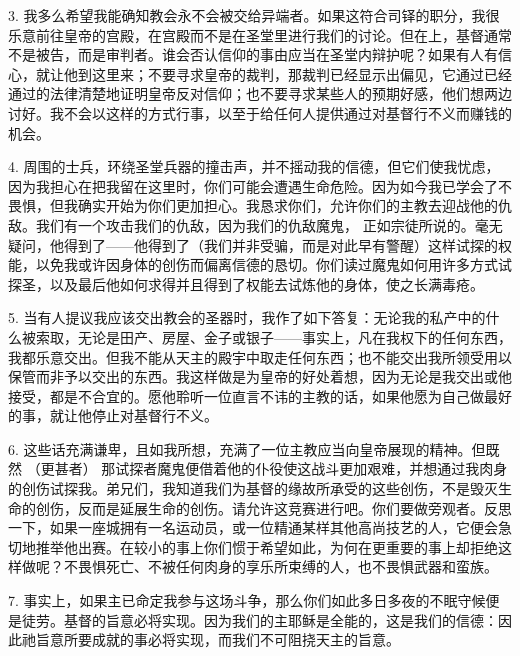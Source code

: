 3. 我多么希望我能确知教会永不会被交给异端者。如果这符合司铎的职分，我很乐意前往皇帝的宫殿，在宫殿而不是在圣堂里进行我们的讨论。但在上，基督通常不是被告，而是审判者。谁会否认信仰的事由应当在圣堂内辩护呢？如果有人有信心，就让他到这里来；不要寻求皇帝的裁判，那裁判已经显示出偏见，它通过已经通过的法律清楚地证明皇帝反对信仰；也不要寻求某些人的预期好感，他们想两边讨好。我不会以这样的方式行事，以至于给任何人提供通过对基督行不义而赚钱的机会。\par

4. 周围的士兵，环绕圣堂兵器的撞击声，并不摇动我的信德，但它们使我忧虑，因为我担心在把我留在这里时，你们可能会遭遇生命危险。因为如今我已学会了不畏惧，但我确实开始为你们更加担心。我恳求你们，允许你们的主教去迎战他的仇敌。我们有一个攻击我们的仇敌，因为我们的仇敌魔鬼，  正如宗徒所说的。毫无疑问，他得到了——他得到了（我们并非受骗，而是对此早有警醒）这样试探的权能，以免我或许因身体的创伤而偏离信德的恳切。你们读过魔鬼如何用许多方式试探圣，以及最后他如何求得并且得到了权能去试炼他的身体，使之长满毒疮。\par

5. 当有人提议我应该交出教会的圣器时，我作了如下答复：无论我的私产中的什么被索取，无论是田产、房屋、金子或银子——事实上，凡在我权下的任何东西，我都乐意交出。但我不能从天主的殿宇中取走任何东西；也不能交出我所领受用以保管而非予以交出的东西。我这样做是为皇帝的好处着想，因为无论是我交出或他接受，都是不合宜的。愿他聆听一位直言不讳的主教的话，如果他愿为自己做最好的事，就让他停止对基督行不义。\par

6. 这些话充满谦卑，且如我所想，充满了一位主教应当向皇帝展现的精神。但既然 （更甚者）  那试探者魔鬼便借着他的仆役使这战斗更加艰难，并想通过我肉身的创伤试探我。弟兄们，我知道我们为基督的缘故所承受的这些创伤，不是毁灭生命的创伤，反而是延展生命的创伤。请允许这竞赛进行吧。你们要做旁观者。反思一下，如果一座城拥有一名运动员，或一位精通某样其他高尚技艺的人，它便会急切地推举他出赛。在较小的事上你们惯于希望如此，为何在更重要的事上却拒绝这样做呢？不畏惧死亡、不被任何肉身的享乐所束缚的人，也不畏惧武器和蛮族。\par

7. 事实上，如果主已命定我参与这场斗争，那么你们如此多日多夜的不眠守候便是徒劳。基督的旨意必将实现。因为我们的主耶稣是全能的，这是我们的信德：因此祂旨意所要成就的事必将实现，而我们不可阻挠天主的旨意。\par

